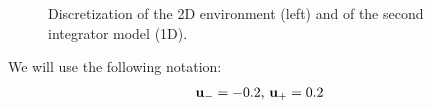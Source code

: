 \begin{figure}
\centering
\begin{minipage}[b]{0.49\linewidth}

\end{minipage}
\begin{minipage}[b]{0.49\linewidth}

\end{minipage}
\caption{Discretization of the 2D environment (left) and of the second integrator model (1D).}
\end{figure}

We will use the following notation:
\begin{equation}
\begin{split}
 \mathbf{u}_{-} = -0.2
\textrm{, }
 \mathbf{u}_{+} = 0.2
\end{split}
\end{equation}
